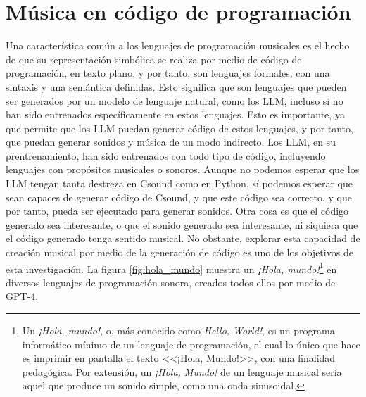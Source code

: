 \section{Música en código de programación}

Una característica común a los lenguajes de programación musicales es el hecho de que su representación simbólica se realiza por medio de código de programación, en texto plano, y por tanto, son lenguajes formales, con una sintaxis y una semántica definidas. Esto significa que son lenguajes que pueden ser generados por un modelo de lenguaje natural, como los LLM, incluso si no han sido entrenados específicamente en estos lenguajes. Esto es importante, ya que permite que los LLM puedan generar código de estos lenguajes, y por tanto, que puedan generar sonidos y música de un modo indirecto. Los LLM, en su prentrenamiento, han sido entrenados con todo tipo de código, incluyendo lenguajes con propósitos musicales o sonoros. Aunque no podemos esperar que los LLM tengan tanta destreza en Csound como en Python, sí podemos esperar que sean capaces de generar código de Csound, y que este código sea correcto, y que por tanto, pueda ser ejecutado para generar sonidos. Otra cosa es que el código generado sea interesante, o que el sonido generado sea interesante, ni siquiera que el código generado tenga sentido musical. No obstante, explorar esta capacidad de creación musical por medio de la generación de código es uno de los objetivos de esta investigación. La figura \ref{fig:hola_mundo} muestra un \textit{¡Hola, mundo!}\footnote{Un \textit{¡Hola, mundo!}, o, más conocido como \textit{Hello, World!}, es un programa informático mínimo de un lenguaje de programación, el cual lo único que hace es imprimir en pantalla el texto <<¡Hola, Mundo!>>, con una finalidad pedagógica. Por extensión, un \textit{¡Hola, Mundo!} de un lenguaje musical sería aquel que produce un sonido simple, como una onda sinusoidal.} en diversos lenguajes de programación sonora, creados todos ellos por medio de GPT-4.

